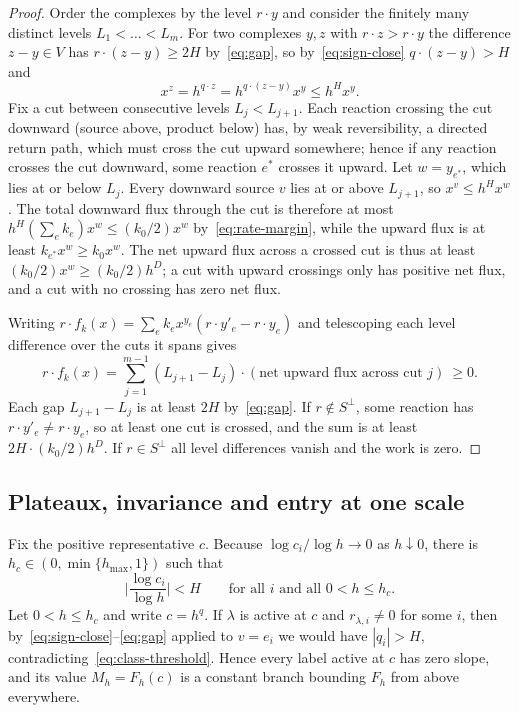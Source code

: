 \documentclass[11pt,a4paper]{article}
\theoremstyle{plain}
\theoremstyle{definition}
\theoremstyle{remark}
\begin{document}
\begin{proof}
Order the complexes by the level $r\cdot y$ and consider the finitely many distinct levels $L_1<\dots<L_m$. For two complexes $y,z$ with $r\cdot z>r\cdot y$ the difference $z-y\in V$ has $r\cdot(z-y)\ge2H$ by~\eqref{eq:gap}, so by~\eqref{eq:sign-close} $q\cdot(z-y)>H$ and
\[
 x^{z}=h^{q\cdot z}=h^{q\cdot(z-y)}x^{y}\le h^{H}x^{y}.
\]
Fix a cut between consecutive levels $L_j<L_{j+1}$. Each reaction crossing the cut downward (source above, product below) has, by weak reversibility, a directed return path, which must cross the cut upward somewhere; hence if any reaction crosses the cut downward, some reaction $e^*$ crosses it upward. Let $w=y_{e^*}$, which lies at or below $L_j$. Every downward source $v$ lies at or above $L_{j+1}$, so $x^{v}\le h^Hx^{w}$. The total downward flux through the cut is therefore at most $h^H(\sum_ek_e)x^w\le(k_0/2)x^w$ by~\eqref{eq:rate-margin}, while the upward flux is at least $k_{e^*}x^w\ge k_0x^w$. The net upward flux across a crossed cut is thus at least $(k_0/2)x^w\ge(k_0/2)h^D$; a cut with upward crossings only has positive net flux, and a cut with no crossing has zero net flux.

Writing $r\cdot f_k(x)=\sum_ek_ex^{y_e}(r\cdot y'_e-r\cdot y_e)$ and telescoping each level difference over the cuts it spans gives
\[
 r\cdot f_k(x)=\sum_{j=1}^{m-1}(L_{j+1}-L_j)\cdot(\text{net upward flux across cut }j)\ \ge0 .
\]
Each gap $L_{j+1}-L_j$ is at least $2H$ by~\eqref{eq:gap}. If $r\notin S^\perp$, some reaction has $r\cdot y'_e\neq r\cdot y_e$, so at least one cut is crossed, and the sum is at least $2H\cdot(k_0/2)h^D$. If $r\in S^\perp$ all level differences vanish and the work is zero.
\end{proof}

\subsection{Plateaux, invariance and entry at one scale}
Fix the positive representative $c$. Because $\log c_i/\log h\to0$ as $h\downarrow0$, there is $h_c\in(0,\min\{h_{\max},1\})$ such that
\begin{equation}\label{eq:class-threshold}
 \Big|\frac{\log c_i}{\log h}\Big|<H\qquad\text{for all }i\text{ and all }0<h\le h_c .
\end{equation}
Let $0<h\le h_c$ and write $c=h^{q}$. If $\lambda$ is active at $c$ and $r_{\lambda,i}\neq0$ for some $i$, then by~\eqref{eq:sign-close}--\eqref{eq:gap} applied to $v=e_i$ we would have $|q_i|>H$, contradicting~\eqref{eq:class-threshold}. Hence every label active at $c$ has zero slope, and its value $M_h=F_h(c)$ is a constant branch bounding $F_h$ from above everywhere.
\end{document}
